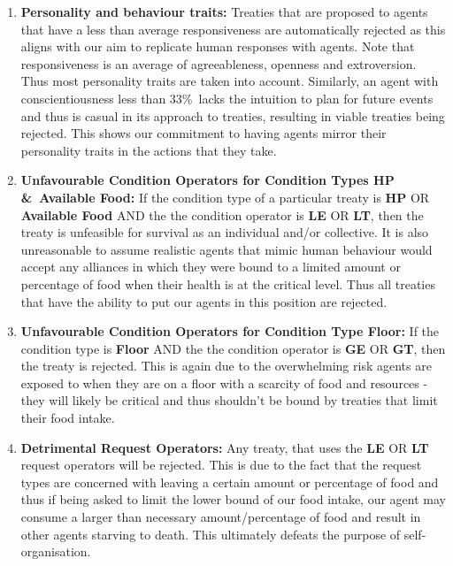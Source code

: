 \begin{enumerate}
    
    \item 
    \textbf{Personality and behaviour traits:} \newline
    Treaties that are proposed to agents that have a less than average responsiveness are automatically rejected as this aligns with our aim to replicate human responses with agents. Note that responsiveness is an average of agreeableness, openness and extroversion. Thus most personality traits are taken into account. Similarly, an agent with conscientiousness less than 33\%\ lacks the intuition to plan for future events and thus is casual in its approach to treaties, resulting in viable treaties being rejected. This shows our commitment to having agents mirror their personality traits in the actions that they take.
    
    \item 
    \textbf{Unfavourable Condition Operators for Condition Types HP \&\ Available Food:} \newline
    If the condition type of a particular treaty is \textbf{HP} OR \textbf{Available Food} AND the the condition operator is \textbf{LE} OR \textbf{LT}, then the treaty is unfeasible for survival as an individual and/or collective. It is also unreasonable to assume realistic agents that mimic human behaviour would accept any alliances in which they were bound to a limited amount or percentage of food when their health is at the critical level. Thus all treaties that have the ability to put our agents in this position are rejected.
    
    \item 
    \textbf{Unfavourable Condition Operators for Condition Type Floor:} \newline
    If the condition type is \textbf{Floor} AND the the condition operator is \textbf{GE} OR \textbf{GT}, then the treaty is rejected. This is again due to the overwhelming risk agents are exposed to when they are on a floor with a scarcity of food and resources - they will likely be critical and thus shouldn't be bound by treaties that limit their food intake.
    
    \item 
    \textbf{Detrimental Request Operators:}\newline
    Any treaty, that uses the \textbf{LE} OR \textbf{LT} request operators will be rejected. This is due to the fact that the request types are concerned with leaving a certain amount or percentage of food and thus if being asked to limit the lower bound of our food intake, our agent may consume a larger than necessary amount/percentage of food and result in other agents starving to death. This ultimately defeats the purpose of self-organisation.
    

\end{enumerate}
